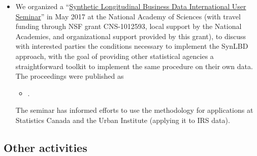 \documentclass[12pt]{article}
\begin{document}
\begin{itemize}
\item We organized a ``\href{https://www.ncrn.cornell.edu/event/synthetic-longitudinal-business-data-international-user-seminar/?instance_id=104227}{Synthetic Longitudinal Business Data International User Seminar}'' in May 2017 at the National Academy of Sciences (with travel funding through NSF grant CNS-1012593, local support by the National Academies, and organizational support provided by this grant), to discuss with interested parties the conditions necessary to implement the SynLBD approach, with the goal of providing other statistical agencies a straightforward toolkit to implement the same procedure on their own data. The proceedings were published as \begin{itemize}
	\item[] .
\end{itemize}
The seminar has informed efforts to use the methodology for applications at Statistics Canada and the Urban Institute (applying it to IRS data).
\end{itemize}


	



\subsection{Other activities}
\end{document}
